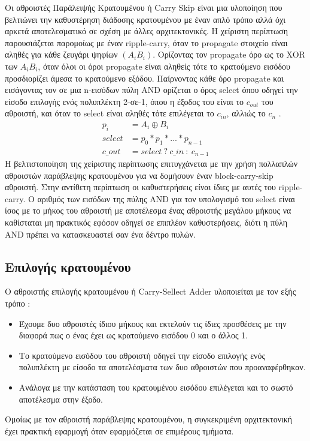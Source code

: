 Οι αθροιστές Παράλειψής Κρατουμένου ή Carry Skip είναι μια υλοποίηση που βελτιώνει την καθυστέρηση διάδοσης κρατουμένου με έναν απλό τρόπο αλλά όχι αρκετά αποτελεσματικό σε σχέση με άλλες αρχιτεκτονικές. 
Η χείριστη περίπτωση παρουσιάζεται παρομοίως με έναν ripple-carry, όταν το propagate στοιχείο είναι αληθές για κάθε ζευγάρι ψηφίων $(A_i B_i)$.
Ορίζοντας τον propagate όρο ως το XOR των $Α_i B_i$, όταν όλοι οι όροι propagate είναι αληθείς τότε το κρατούμενο εισόδου προσδιορίζει άμεσα το κρατούμενο εξόδου.
Παίρνοντας κάθε όρο propagate και εισάγοντας τον σε μια n-εισόδων πύλη AND ορίζεται ο όρος select όπου οδηγεί την είσοδο επιλογής ενός πολυπλέκτη 2-σε-1, όπου η έξοδος του είναι το $c_{out}$ του αθροιστή, και όταν το select είναι αληθές τότε επιλέγεται το $c_{in}$, αλλιώς το $c_n$ .
\begin{equation}
\begin{split}
    p_i &= A_i \oplus B_i \\
    select &= p_0 * p_1 * ... * p_{n-1} \\
    c\_out &= select\ ?\ c\_in\ :\ c_{n-1} %
\end{split}
\end{equation}
Η βελτιστοποίηση της χείριστης περίπτωσης επιτυγχάνεται με την χρήση πολλαπλών αθροιστών παράβλεψης κρατουμένου για να δομήσουν έναν block-carry-skip αθροιστή. Στην αντίθετη περίπτωση οι καθυστερήσεις είναι ίδιες με αυτές του ripple-carry.
Ο αριθμός των εισόδων της πύλης AND για τον υπολογισμό του select είναι ίσος με το μήκος του αθροιστή με αποτέλεσμα ένας αθροιστής μεγάλου μήκους να καθίσταται μη πρακτικός εφόσον οδηγεί σε επιπλέον καθυστερήσεις, διότι η πύλη AND πρέπει να κατασκευαστεί σαν ένα δέντρο πυλών.   



\subsection{Επιλογής κρατουμένου}
Ο αθροιστής επιλογής κρατουμένου ή Carry-Sellect Adder υλοποιείται με τον εξής τρόπο :
\begin{itemize}
  \item Έχουμε δυο αθροιστές ίδιου μήκους και εκτελούν τις ίδιες προσθέσεις με την διαφορά πως ο ένας έχει ως κρατούμενο εισόδου 0 και ο άλλος 1.
  \item Το κρατούμενο εισόδου του αθροιστή οδηγεί την είσοδο επιλογής ενός πολυπλέκτη με είσοδο τα αποτελέσματα των δυο αθροιστών που προαναφέρθηκαν.
  \item Ανάλογα με την κατάσταση του κρατουμένου εισόδου επιλέγεται και το σωστό αποτέλεσμα στην έξοδο.
\end{itemize} 
Ομοίως με τον αθροιστή παράβλεψης κρατουμένου, η συγκεκριμένη αρχιτεκτονική έχει πρακτική εφαρμογή όταν εφαρμόζεται σε επιμέρους τμήματα.









